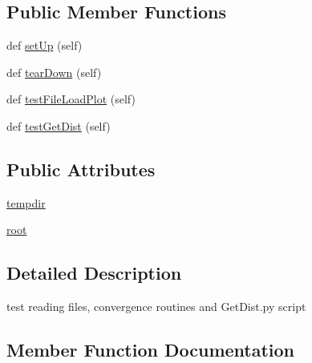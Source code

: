\subsection*{Public Member Functions}
\begin{DoxyCompactItemize}
\item 
def \mbox{\hyperlink{classgetdist__tests_1_1getdist__test_1_1GetDistFileTest_ad8aad492b809233c4c92d6e9b9341352}{set\+Up}} (self)
\item 
def \mbox{\hyperlink{classgetdist__tests_1_1getdist__test_1_1GetDistFileTest_a35d68dceb9a94bc1b3f36da885eb9580}{tear\+Down}} (self)
\item 
def \mbox{\hyperlink{classgetdist__tests_1_1getdist__test_1_1GetDistFileTest_aa282696486ba5c65dbbe19e29e9623e9}{test\+File\+Load\+Plot}} (self)
\item 
def \mbox{\hyperlink{classgetdist__tests_1_1getdist__test_1_1GetDistFileTest_aab1a319882d71be14dacf9c410204bb3}{test\+Get\+Dist}} (self)
\end{DoxyCompactItemize}
\subsection*{Public Attributes}
\begin{DoxyCompactItemize}
\item 
\mbox{\hyperlink{classgetdist__tests_1_1getdist__test_1_1GetDistFileTest_ad921949ff7c737acc17504f743971e79}{tempdir}}
\item 
\mbox{\hyperlink{classgetdist__tests_1_1getdist__test_1_1GetDistFileTest_a1f61ef38e6df66878e69c3ba48482ba5}{root}}
\end{DoxyCompactItemize}


\subsection{Detailed Description}
\begin{DoxyVerb}test reading files, convergence routines and GetDist.py script\end{DoxyVerb}
 

\subsection{Member Function Documentation}
\mbox{\label{classgetdist__tests_1_1getdist__test_1_1GetDistFileTest_ad8aad492b809233c4c92d6e9b9341352}} 
